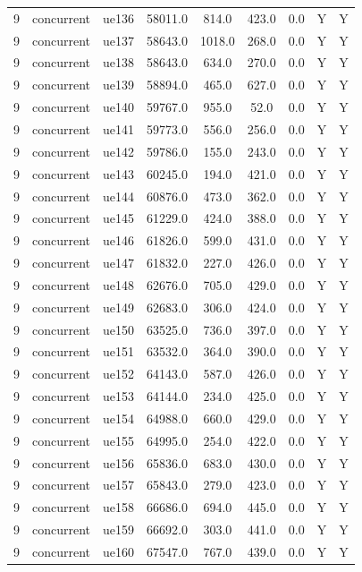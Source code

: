 \begin{table}[ht]
\begin{tabular}{|c|c|c|c|c|c|c|c|c|}
9 & concurrent & ue136 & 58011.0 & 814.0 & 423.0 & 0.0 & Y & Y \\
9 & concurrent & ue137 & 58643.0 & 1018.0 & 268.0 & 0.0 & Y & Y \\
9 & concurrent & ue138 & 58643.0 & 634.0 & 270.0 & 0.0 & Y & Y \\
9 & concurrent & ue139 & 58894.0 & 465.0 & 627.0 & 0.0 & Y & Y \\
9 & concurrent & ue140 & 59767.0 & 955.0 & 52.0 & 0.0 & Y & Y \\
9 & concurrent & ue141 & 59773.0 & 556.0 & 256.0 & 0.0 & Y & Y \\
9 & concurrent & ue142 & 59786.0 & 155.0 & 243.0 & 0.0 & Y & Y \\
9 & concurrent & ue143 & 60245.0 & 194.0 & 421.0 & 0.0 & Y & Y \\
9 & concurrent & ue144 & 60876.0 & 473.0 & 362.0 & 0.0 & Y & Y \\
9 & concurrent & ue145 & 61229.0 & 424.0 & 388.0 & 0.0 & Y & Y \\
9 & concurrent & ue146 & 61826.0 & 599.0 & 431.0 & 0.0 & Y & Y \\
9 & concurrent & ue147 & 61832.0 & 227.0 & 426.0 & 0.0 & Y & Y \\
9 & concurrent & ue148 & 62676.0 & 705.0 & 429.0 & 0.0 & Y & Y \\
9 & concurrent & ue149 & 62683.0 & 306.0 & 424.0 & 0.0 & Y & Y \\
9 & concurrent & ue150 & 63525.0 & 736.0 & 397.0 & 0.0 & Y & Y \\
9 & concurrent & ue151 & 63532.0 & 364.0 & 390.0 & 0.0 & Y & Y \\
9 & concurrent & ue152 & 64143.0 & 587.0 & 426.0 & 0.0 & Y & Y \\
9 & concurrent & ue153 & 64144.0 & 234.0 & 425.0 & 0.0 & Y & Y \\
9 & concurrent & ue154 & 64988.0 & 660.0 & 429.0 & 0.0 & Y & Y \\
9 & concurrent & ue155 & 64995.0 & 254.0 & 422.0 & 0.0 & Y & Y \\
9 & concurrent & ue156 & 65836.0 & 683.0 & 430.0 & 0.0 & Y & Y \\
9 & concurrent & ue157 & 65843.0 & 279.0 & 423.0 & 0.0 & Y & Y \\
9 & concurrent & ue158 & 66686.0 & 694.0 & 445.0 & 0.0 & Y & Y \\
9 & concurrent & ue159 & 66692.0 & 303.0 & 441.0 & 0.0 & Y & Y \\
9 & concurrent & ue160 & 67547.0 & 767.0 & 439.0 & 0.0 & Y & Y \\

\end{tabular}
\end{table}
